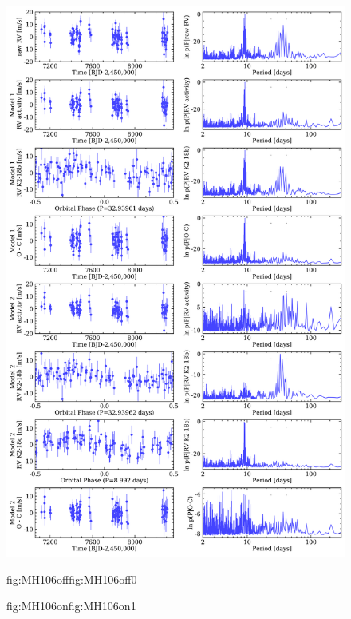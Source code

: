 \begin{figure} %
  \centering
  \includegraphics[width=0.8\hsize]{figures/analysisH106_bkgd.png}%
  \hspace{-0.8\hsize}%
  \begin{ocg}{fig:MH106off}{fig:MH106off}{0}%
  \end{ocg}%
  \begin{ocg}{fig:MH106on}{fig:MH106on}{1}%

\end{ocg}
\end{figure}
